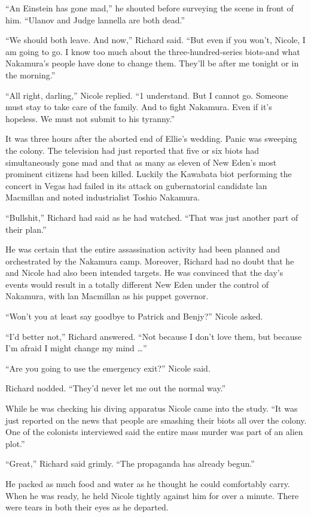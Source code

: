 \documentclass[]{article}
\begin{document}
{“An Einstein has gone mad,” he shouted before surveying the scene in front of him. “Ulanov and Judge lannella are both dead.”

“We should both leave. And now,” Richard said. “But even if you won’t, Nicole, I am going to go. I know too much about the three-hundred-series biots-and what Nakamura’s people have done to change them. They’ll be after me tonight or in the morning.”

“All right, darling,” Nicole replied. “1 understand. But I cannot go. Someone must stay to take care of the family. And to fight Nakamura. Even if it’s hopeless. We must not submit to his tyranny.”

It was three hours after the aborted end of Ellie’s wedding. Panic was sweeping the colony. The television had just reported that five or six biots had simultaneously gone mad and that as many as eleven of New Eden’s most prominent citizens had been killed. Luckily the Kawabata biot performing the concert in Vegas had failed in its attack on gubernatorial candidate lan Macmillan and noted industrialist Toshio Nakamura.

“Bullshit,” Richard had said as he had watched. “That was just another part of their plan.”

He was certain that the entire assassination activity had been planned and orchestrated by the Nakamura camp. Moreover, Richard had no doubt that he and Nicole had also been intended targets. He was convinced that the day’s events would result in a totally different New Eden under the control of Nakamura, with lan Macmillan as his puppet governor.

“Won’t you at least say goodbye to Patrick and Benjy?” Nicole asked.

“I’d better not,” Richard answered. “Not because I don’t love them, but because I’m afraid I might change my mind …”

“Are you going to use the emergency exit?” Nicole said.

Richard nodded. “They’d never let me out the normal way.”

While he was checking his diving apparatus Nicole came into the study. “It was just reported on the news that people are smashing their biots all over the colony. One of the colonists interviewed said the entire mass murder was part of an alien plot.”

“Great,” Richard said grimly. “The propaganda has already begun.”

He packed as much food and water as he thought he could comfortably carry. When he was ready, he held Nicole tightly against him for over a minute. There were tears in both their eyes as he departed.

}
\end{document}
